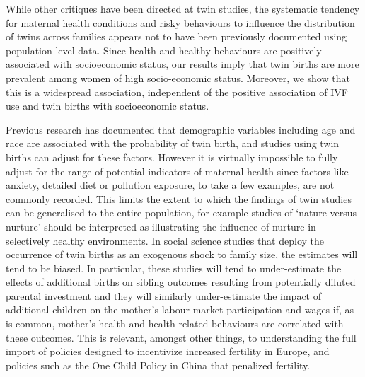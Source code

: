 \documentclass{nature}
\begin{document}
\begin{linenumbers}

While other critiques have been directed at twin studies, the systematic tendency for maternal health conditions and risky behaviours to influence the distribution of twins across families appears not to have been previously documented using population-level data. Since health and healthy behaviours are positively associated with socioeconomic status, our results imply that twin births are more prevalent among women of high socio-economic status. Moreover, we show that this is a widespread association, independent of the positive association of IVF use and twin births with socioeconomic status.

Previous research has documented that demographic variables including age and race are associated with the probability of twin birth, and studies using twin births can adjust for these factors. However it is virtually impossible to fully adjust for the range of potential indicators of maternal health since factors like anxiety, detailed diet or pollution exposure, to take a few examples, are not commonly recorded. This limits the extent to which the findings of twin studies can be generalised to the entire population, for example studies of `nature versus nurture' should be interpreted as illustrating the influence of nurture in selectively healthy environments. In social science studies that deploy the occurrence of twin births as an exogenous shock to family size, the estimates will tend to be biased. In particular, these studies will tend to under-estimate the effects of additional births on sibling outcomes resulting from potentially diluted parental investment and they will similarly under-estimate the impact of additional children on the mother's labour market participation and wages if, as is common, mother's health and health-related behaviours are correlated with these outcomes. This is relevant, amongst other things, to understanding the full import of policies designed to incentivize increased fertility in Europe, and policies such as the One Child Policy in China that penalized fertility. 


\end{linenumbers}
\end{document}
